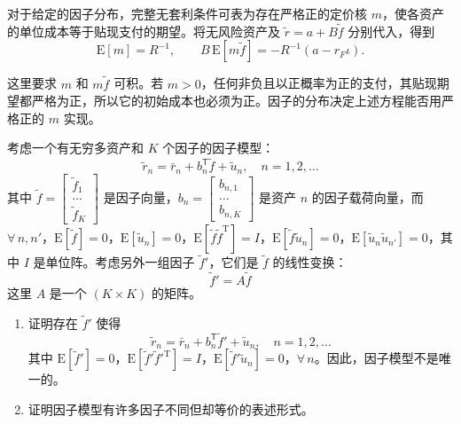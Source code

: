 \begin{solution}[blank-type=manual,blank-vsep=9\baselineskip]
对于给定的因子分布，完整无套利条件可表为存在严格正的定价核 $m$，使各资产的单位成本等于贴现支付的期望。将无风险资产及 $\widetilde r=a+B\widetilde f$ 分别代入，得到
\[
 \mathrm E[m]=R^{-1},\qquad
 B\,\mathrm E[m\widetilde f]=-R^{-1}(a-r_F\iota).
\]

这里要求 $m$ 和 $m\widetilde f$ 可积。若 $m>0$，任何非负且以正概率为正的支付，其贴现期望都严格为正，所以它的初始成本也必须为正。因子的分布决定上述方程能否用严格正的 $m$ 实现。\qedhere
\end{solution}

\par\noindent\begin{minipage}{\linewidth}
\begin{problem}
 考虑一个有无穷多资产和 $K$ 个因子的因子模型：
\[
    \tilde{r}_{n}=\bar{r}_{n}+b_{n}^{\mathsf T}\tilde{f}+\tilde{u}_{n},\quad n=1,2,\ldots
\]
其中 $\tilde{f}=\begin{bmatrix}\tilde{f}_{1} \\ \ldots \\ \tilde{f}_{K}\end{bmatrix}$ 是因子向量，$b_{n}=\begin{bmatrix}b_{n,1} \\ \ldots \\ b_{n,K}\end{bmatrix}$ 是资产 $n$ 的因子载荷向量，而 $\forall\,n,n'$，$\mathrm{E}[\tilde{f}]=0$，$\mathrm{E}[\tilde{u}_{n}]=0$，$\mathrm{E}[\tilde{f}\tilde{f}^{\mathrm{T}}]=I$，$\mathrm{E}[\tilde{f}\tilde{u}_{n}]=0$，$\mathrm{E}[\tilde{u}_{n}\tilde{u}_{n'}]=0$，其中 $I$ 是单位阵。考虑另外一组因子 $\tilde{f}'$，它们是 $\tilde{f}$ 的线性变换：
\[
    \tilde{f}'=A\tilde{f}
\]
这里 $A$ 是一个 $(K\times K)$ 的矩阵。
\begin{enumerate}[label=(\alph*)]
    \item 证明存在 $\tilde{f}'$ 使得
    \[
        \tilde{r}_{n}=\bar{r}_{n}+b_{n}^{\mathsf T}\tilde{f}'+\tilde{u}_{n},\quad n=1,2,\ldots
    \]
    其中 $\mathrm{E}[\tilde{f}']=0$，$\mathrm{E}[\tilde{f}'\tilde{f}'^{\mathrm{T}}]=I$，$\mathrm{E}[\tilde{f}'\tilde{u}_{n}]=0$，$\forall\,n$。因此，因子模型不是唯一的。
    \item 证明因子模型有许多因子不同但却等价的表述形式。
\end{enumerate}
\end{problem}
\end{minipage}\par
{}
